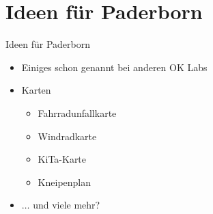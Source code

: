 \section{Ideen für Paderborn}

\begin{frame}{Ideen für Paderborn}
 \begin{itemize}
  \item Einiges schon genannt bei anderen OK Labs
  \item Karten
  \begin{itemize}
   \item Fahrradunfallkarte
   \item Windradkarte
   \item KiTa-Karte
   \item Kneipenplan
  \end{itemize}
  \item $\dots$ und viele mehr?
 \end{itemize}
\end{frame}